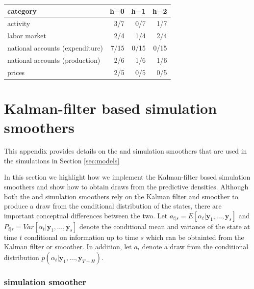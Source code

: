 \documentclass[notitlepage,a4paper,12pt]{article}
\begin{document}
\begin{table}[ht]
    \centering
    \begin{tabular}{lrrr}
      \hline
      category & h=0 & h=1 & h=2 \\ 
      \hline
     activity & 3/7 & 0/7 & 1/7 \\ 
       labor market & 2/4 & 1/4 & 2/4 \\ 
       national accounts (expenditure) & 7/15 & 0/15 & 0/15 \\ 
       national accounts (production) & 2/6 & 1/6 & 1/6 \\ 
       prices & 2/5 & 0/5 & 0/5 \\ 
       \hline
    \end{tabular}
\end{table}




\pagebreak
\appendix

\section{Kalman-filter based simulation smoothers}\label{app:kalmansimsmoothers}

This appendix provides details on the \citet{carterkohn1994_biomtr} and \citet{durbinkoopman2002_biomtr} simulation smoothers that are used in the simulations in Section \ref{sec:models}

In this section we highlight how we implement the Kalman-filter based simulation smoothers and show how to obtain draws from the predictive densities. Although both the \citet{carterkohn1994_biomtr} and \citet{durbinkoopman2002_biomtr} simulation smoothers rely on the Kalman filter and smoother to produce a draw from the conditional distribution of the states, there are important conceptual differences between the two. Let $a_{t|s} = E[\alpha_t|\mathbf{y}_1, \dots, \mathbf{y}_s]$ and $P_{t|s} = Var[\alpha_t|\mathbf{y}_1, \dots, \mathbf{y}_s]$ denote the conditional mean and variance of the state at time $t$ conditional on information up to time $s$ which can be obtainted from the Kalman filter or smoother. In addition, let $a_t$ denote a draw from the conditional distribution $p(\alpha_t | \mathbf{y}_1, \dots, \mathbf{y}_{T+H})$. 

\subsubsection{\citet{carterkohn1994_biomtr} simulation smoother}
\end{document}
